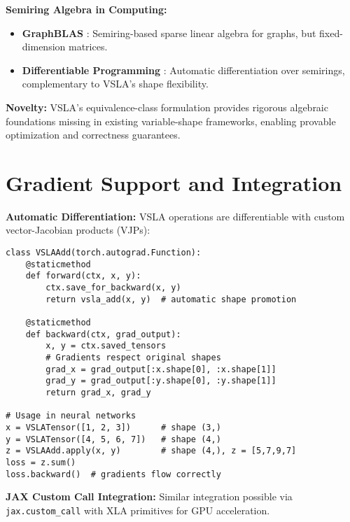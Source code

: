 \documentclass[11pt]{article}
\begin{document}
\textbf{Semiring Algebra in Computing:}
\begin{itemize}[leftmargin=1.5em]  
\item \textbf{GraphBLAS} \cite{GraphBLAS2019}: Semiring-based sparse linear algebra for graphs, but fixed-dimension matrices.
\item \textbf{Differentiable Programming} \cite{Innes2019}: Automatic differentiation over semirings, complementary to VSLA's shape flexibility.
\end{itemize}

\textbf{Novelty:} VSLA's equivalence-class formulation provides rigorous algebraic foundations missing in existing variable-shape frameworks, enabling provable optimization and correctness guarantees.

\section{Gradient Support and Integration}  
\label{sec:autograd}

\textbf{Automatic Differentiation:} VSLA operations are differentiable with custom vector-Jacobian products (VJPs):

\begin{tcolorbox}[colback=api,colframe=green!50!black,title=PyTorch Integration Example]
\begin{verbatim}
class VSLAAdd(torch.autograd.Function):
    @staticmethod
    def forward(ctx, x, y):
        ctx.save_for_backward(x, y)
        return vsla_add(x, y)  # automatic shape promotion
    
    @staticmethod  
    def backward(ctx, grad_output):
        x, y = ctx.saved_tensors
        # Gradients respect original shapes
        grad_x = grad_output[:x.shape[0], :x.shape[1]]  
        grad_y = grad_output[:y.shape[0], :y.shape[1]]
        return grad_x, grad_y

# Usage in neural networks
x = VSLATensor([1, 2, 3])      # shape (3,)
y = VSLATensor([4, 5, 6, 7])   # shape (4,) 
z = VSLAAdd.apply(x, y)        # shape (4,), z = [5,7,9,7]
loss = z.sum()
loss.backward()  # gradients flow correctly
\end{verbatim}
\end{tcolorbox}

\textbf{JAX Custom Call Integration:} Similar integration possible via \texttt{jax.custom\_call} with XLA primitives for GPU acceleration.

\end{document}
